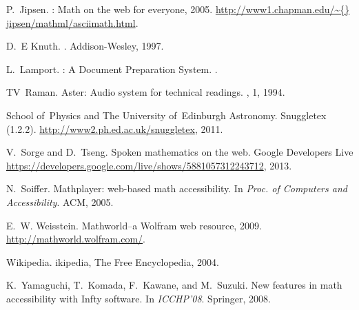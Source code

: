 \documentclass{sig-alternate}
\begin{document}
\begin{thebibliography}{10}
P.~Jipsen.
: Math on the web for everyone, 2005.
\newblock \url{http://www1.chapman.edu/\~{}
  jipsen/mathml/asciimath.html}.

D.~E Knuth.
.
\newblock Addison-Wesley, 1997.

L.~Lamport.
\newblock {\LaTeX}: A Document Preparation System.
.

TV~Raman.
\newblock Aster: Audio system for technical readings.
, 1, 1994.

School of~Physics and The University of~Edinburgh Astronomy.
\newblock Snuggletex (1.2.2).
\newblock \url{http://www2.ph.ed.ac.uk/snuggletex}, 2011.

V.~Sorge and D.~Tseng.
\newblock Spoken mathematics on the web.
\newblock Google Developers Live
  \url{https://developers.google.com/live/shows/5881057312243712}, 2013.

N.~Soiffer.
\newblock Mathplayer: web-based math accessibility.
\newblock In {\em Proc. of Computers and Accessibility}. ACM, 2005.

E.~W. Weisstein.
\newblock Mathworld--a Wolfram web resource, 2009.
\newblock \url{http://mathworld.wolfram.com/}.

Wikipedia.
ikipedia{,} {The Free Encyclopedia}, 2004.

K.~Yamaguchi, T.~Komada, F.~Kawane, and M.~Suzuki.
\newblock New features in math accessibility with Infty software.
\newblock In {\em ICCHP'08}. Springer, 2008.

\end{thebibliography}
\end{document}

